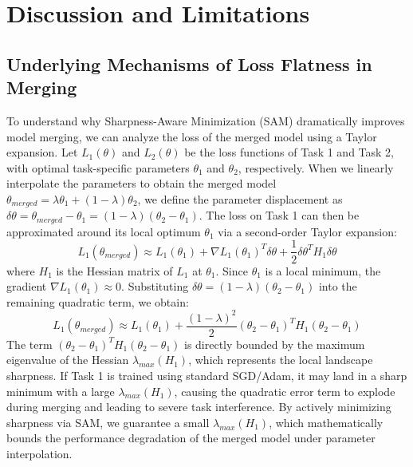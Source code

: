 \documentclass{article}
\begin{document}
\section{Discussion and Limitations}
\label{submission-discussion}

\subsection{Underlying Mechanisms of Loss Flatness in Merging}
To understand why Sharpness-Aware Minimization (SAM) dramatically improves model merging, we can analyze the loss of the merged model using a Taylor expansion. Let $L_1(\theta)$ and $L_2(\theta)$ be the loss functions of Task 1 and Task 2, with optimal task-specific parameters $\theta_1$ and $\theta_2$, respectively. When we linearly interpolate the parameters to obtain the merged model $\theta_{merged} = \lambda \theta_1 + (1-\lambda) \theta_2$, we define the parameter displacement as $\delta\theta = \theta_{merged} - \theta_1 = (1-\lambda)(\theta_2 - \theta_1)$. The loss on Task 1 can then be approximated around its local optimum $\theta_1$ via a second-order Taylor expansion:
\begin{equation}
    L_1(\theta_{merged}) \approx L_1(\theta_1) + \nabla L_1(\theta_1)^T \delta\theta + \frac{1}{2} \delta\theta^T H_1 \delta\theta
\end{equation}
where $H_1$ is the Hessian matrix of $L_1$ at $\theta_1$. Since $\theta_1$ is a local minimum, the gradient $\nabla L_1(\theta_1) \approx 0$. Substituting $\delta\theta = (1-\lambda)(\theta_2 - \theta_1)$ into the remaining quadratic term, we obtain:
\begin{equation}
    L_1(\theta_{merged}) \approx L_1(\theta_1) + \frac{(1-\lambda)^2}{2} (\theta_2 - \theta_1)^T H_1 (\theta_2 - \theta_1)
\end{equation}
The term $(\theta_2 - \theta_1)^T H_1 (\theta_2 - \theta_1)$ is directly bounded by the maximum eigenvalue of the Hessian $\lambda_{max}(H_1)$, which represents the local landscape sharpness. If Task 1 is trained using standard SGD/Adam, it may land in a sharp minimum with a large $\lambda_{max}(H_1)$, causing the quadratic error term to explode during merging and leading to severe task interference. By actively minimizing sharpness via SAM, we guarantee a small $\lambda_{max}(H_1)$, which mathematically bounds the performance degradation of the merged model under parameter interpolation.
\end{document}
